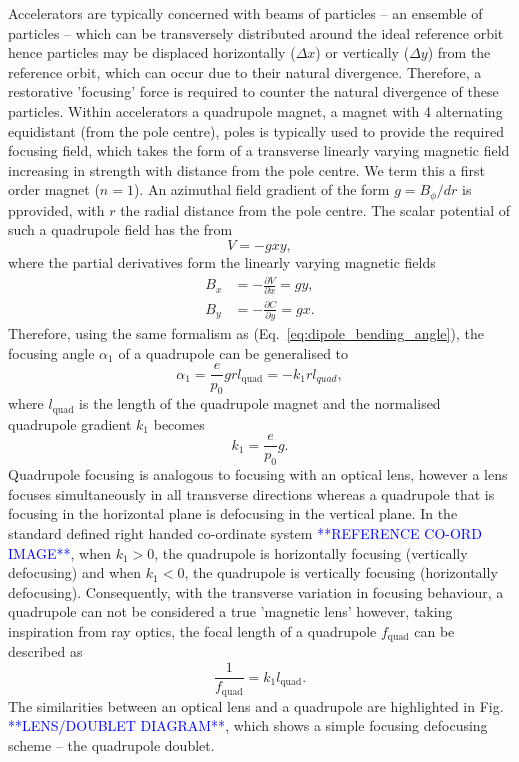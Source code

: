 \documentclass[../main.tex]{subfiles}
\begin{document}
Accelerators are typically concerned with beams of particles -- an ensemble of particles -- which can be transversely distributed around the ideal reference orbit hence particles may be  displaced horizontally ($\Delta x$) or vertically ($\Delta y$) from the reference orbit, which can occur due to their natural divergence. Therefore, a restorative 'focusing' force is required to counter the natural divergence of these particles. Within accelerators a quadrupole magnet, a magnet with 4 alternating equidistant (from the pole centre), poles is typically used to provide the required focusing field, which takes the form of a transverse linearly varying magnetic field increasing in strength with distance from the pole centre. We term this a first order magnet ($n=1$). An azimuthal field gradient of the form $g = B_{\phi}/dr$ is pprovided, with $r$ the radial distance from the pole centre. The scalar potential of such a quadrupole field has the from
\begin{equation}
V = -gxy,
\label{eq:quadrupole_potential}    
\end{equation}
where the partial derivatives form the linearly varying magnetic fields
\begin{align}
B_{x} &= -\frac{\partial V}{\partial x} = gy, \nonumber\\
B_{y} &= -\frac{\partial C}{\partial y} = gx.
\end{align}
Therefore, using the same formalism as (Eq.~\ref{eq:dipole_bending_angle}), the focusing angle $\alpha_{1}$ of a quadrupole can be generalised to
\begin{equation}
\alpha_{1} = \frac{e}{p_{0}}grl_{\mathrm{quad}} = -k_{1}rl_{quad},
\label{eq:quadrupole_focusing_angle}    
\end{equation}
where $l_{\mathrm{quad}}$ is the length of the quadrupole magnet and the normalised quadrupole gradient $k_{1}$ becomes
\begin{equation}
k_{1} = \frac{e}{p_{0}}g.
\label{eq:quadrupole_normalised_gradient}
\end{equation}
Quadrupole focusing is analogous to focusing with an optical lens, however a lens focuses simultaneously in all transverse directions whereas a quadrupole that is focusing in the horizontal plane is defocusing in the vertical plane. In the standard defined right handed co-ordinate system \textcolor{blue}{**REFERENCE CO-ORD IMAGE**}, when $k_{1} > 0$, the quadrupole is horizontally focusing (vertically defocusing) and when $k_{1} < 0$, the quadrupole is vertically focusing (horizontally defocusing). Consequently, with the transverse variation in focusing behaviour, a quadrupole can not be considered a true 'magnetic lens' however, taking inspiration from ray optics, the focal length of a quadrupole $f_{\mathrm{quad}}$ can be described as
\begin{equation}
\frac{1}{f_{\mathrm{quad}}} = k_{1}l_{\mathrm{quad}}.
\label{eq:focal_length_quadrupole}    
\end{equation}
The similarities between an optical lens and a quadrupole are highlighted in Fig. \textcolor{blue}{**LENS/DOUBLET DIAGRAM**}, which shows a simple focusing defocusing scheme -- the quadrupole doublet. 
\end{document}
